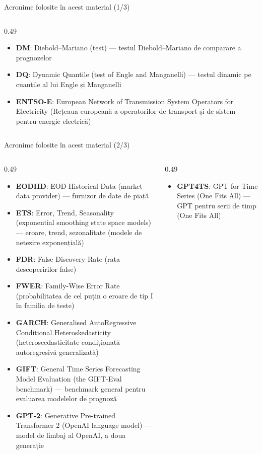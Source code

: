 \begin{frame}{Acronime folosite în acest material (1/3)}
\begin{columns}[T]
\begin{column}{0.49\textwidth}
\begin{itemize}
    \item \textbf{DM}: Diebold–Mariano (test) — testul Diebold–Mariano de comparare a prognozelor
    \item \textbf{DQ}: Dynamic Quantile (test of Engle and Manganelli) — testul dinamic pe cuantile al lui Engle și Manganelli
    \item \textbf{ENTSO-E}: European Network of Transmission System Operators for Electricity (Rețeaua europeană a operatorilor de transport și de sistem pentru energie electrică)
\end{itemize}
\end{column}
\end{columns}
\end{frame}
\begin{frame}{Acronime folosite în acest material (2/3)}
\begin{columns}[T]
\begin{column}{0.49\textwidth}
\begin{itemize}\setlength{\itemsep}{0pt}
    \item \textbf{EODHD}: EOD Historical Data (market-data provider) — furnizor de date de piață
    \item \textbf{ETS}: Error, Trend, Seasonality (exponential smoothing state space models) — eroare, trend, sezonalitate (modele de netezire exponențială)
    \item \textbf{FDR}: False Discovery Rate (rata descoperirilor false)
    \item \textbf{FWER}: Family-Wise Error Rate (probabilitatea de cel puțin o eroare de tip I în familia de teste)
    \item \textbf{GARCH}: Generalised AutoRegressive Conditional Heteroskedasticity (heteroscedasticitate condiționată autoregresivă generalizată)
    \item \textbf{GIFT}: General Time Series Forecasting Model Evaluation (the GIFT-Eval benchmark) — benchmark general pentru evaluarea modelelor de prognoză
    \item \textbf{GPT-2}: Generative Pre-trained Transformer 2 (OpenAI language model) — model de limbaj al OpenAI, a doua generație
\end{itemize}
\end{column}
\begin{column}{0.49\textwidth}
\begin{itemize}\setlength{\itemsep}{0pt}
    \item \textbf{GPT4TS}: GPT for Time Series (One Fits All) — GPT pentru serii de timp (One Fits All)

\end{itemize}
\end{column}
\end{columns}
\end{frame}
